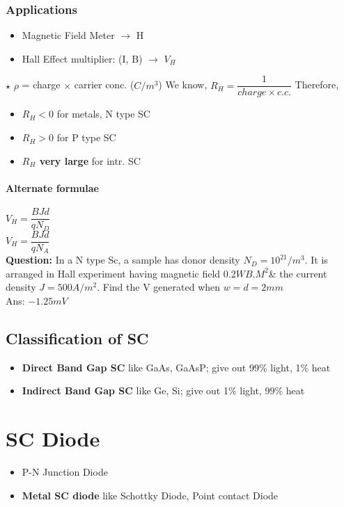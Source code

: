 \documentclass[10pt, a4paper]{report}
\begin{document}
	\subsection{Applications}
	\begin{itemize}
		\item Magnetic Field Meter $\rightarrow$ H
		\item Hall Effect multiplier: (I, B) $\rightarrow$ $ V_H $
	\end{itemize}
	$\star$ $ \rho $ = charge $\times$ carrier conc. ($ C/m^3 $)
	We know, $ R_H = \dfrac{1}{charge \times c.c.} $
	Therefore,
	\begin{itemize}
		\item \textbf{$ R_H < 0 $} for metals, N type SC
		\item \textbf{$ R_H > 0 $} for P type SC
		\item \textbf{$ R_H $ very large} for intr. SC
	\end{itemize}
	\subsubsection{Alternate formulae}
	$ V_H = \dfrac{BJd}{qN_D} $\\
	$ V_H = \dfrac{BJd}{qN_A} $\\
	\textbf{Question:} In a N type Sc, a sample has donor density $ N_D = 10^{21}/m^3 $. It is arranged in Hall experiment having magnetic field $ 0.2 WB.M^2 $\& the current density $ J =  500A/m^2$. Find the V generated when $ w=d=2mm $\\
	Ans: $ -1.25mV $
	
	\section{Classification of SC}
	\begin{itemize}
		\item \textbf{Direct Band Gap SC} like GaAs, GaAsP; give out 99\% light, 1\% heat
		\item \textbf{Indirect Band Gap SC} like Ge, Si; give out 1\% light, 99\% heat
	\end{itemize}


	\chapter{SC Diode}
	\begin{itemize}
		\item P-N Junction Diode
		\item \textbf{Metal SC diode} like Schottky Diode, Point contact Diode
	\end{itemize}
\end{document}
